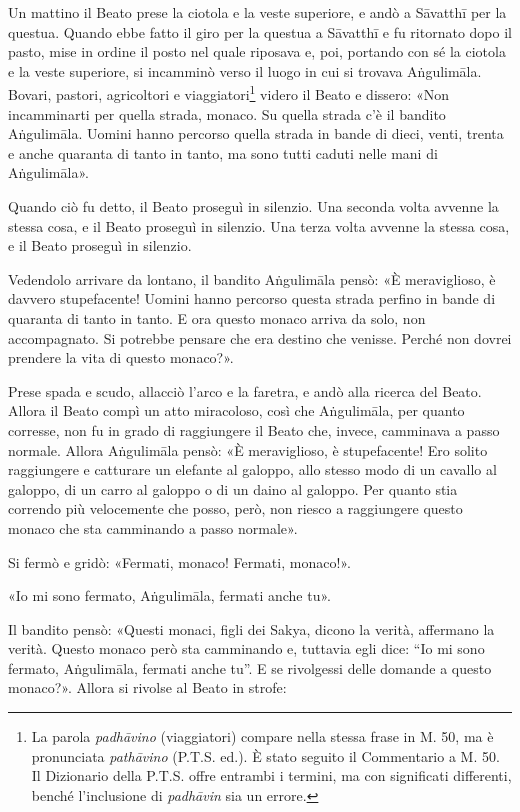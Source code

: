 Un mattino il Beato prese la ciotola e la veste superiore, e andò a
Sāvatthī per la questua. Quando ebbe fatto il giro per la questua a
Sāvatthī e fu ritornato dopo il pasto, mise in ordine il posto nel quale
riposava e, poi, portando con sé la ciotola e la veste superiore, si
incamminò verso il luogo in cui si trovava Aṅgulimāla. Bovari, pastori,
agricoltori e viaggiatori\footnote{La parola \emph{padhāvino} (viaggiatori) compare nella stessa frase in M. 50, ma è pronunciata \emph{pathāvino} (P.T.S. ed.). È stato seguito il Commentario a M. 50. Il Dizionario della P.T.S. offre entrambi i termini, ma con significati differenti, benché l’inclusione di \emph{padhāvin} sia un errore.} videro il Beato e dissero:
«Non incamminarti per quella strada, monaco. Su quella strada c’è il
bandito Aṅgulimāla. Uomini hanno percorso quella strada in bande di
dieci, venti, trenta e anche quaranta di tanto in tanto, ma sono tutti
caduti nelle mani di Aṅgulimāla».


Quando ciò fu detto, il Beato proseguì in silenzio. Una seconda volta
avvenne la stessa cosa, e il Beato proseguì in silenzio. Una terza volta
avvenne la stessa cosa, e il Beato proseguì in silenzio.


Vedendolo arrivare da lontano, il bandito Aṅgulimāla pensò: «È
meraviglioso, è davvero stupefacente! Uomini hanno percorso questa
strada perfino in bande di quaranta di tanto in tanto. E ora questo
monaco arriva da solo, non accompagnato. Si potrebbe pensare che era
destino che venisse. Perché non dovrei prendere la vita di questo
monaco?».


Prese spada e scudo, allacciò l’arco e la faretra, e andò alla ricerca
del Beato. Allora il Beato compì un atto miracoloso, così che
Aṅgulimāla, per quanto corresse, non fu in grado di raggiungere il Beato
che, invece, camminava a passo normale. Allora Aṅgulimāla pensò: «È
meraviglioso, è stupefacente! Ero solito raggiungere e catturare un
elefante al galoppo, allo stesso modo di un cavallo al galoppo, di un
carro al galoppo o di un daino al galoppo. Per quanto stia correndo più
velocemente che posso, però, non riesco a raggiungere questo monaco che
sta camminando a passo normale».


Si fermò e gridò: «Fermati, monaco! Fermati, monaco!».


«Io mi sono fermato, Aṅgulimāla, fermati anche tu».


Il bandito pensò: «Questi monaci, figli dei Sakya, dicono la verità,
affermano la verità. Questo monaco però sta camminando e, tuttavia egli
dice: “Io mi sono fermato, Aṅgulimāla, fermati anche tu”. E se
rivolgessi delle domande a questo monaco?». Allora si rivolse al Beato
in strofe:


